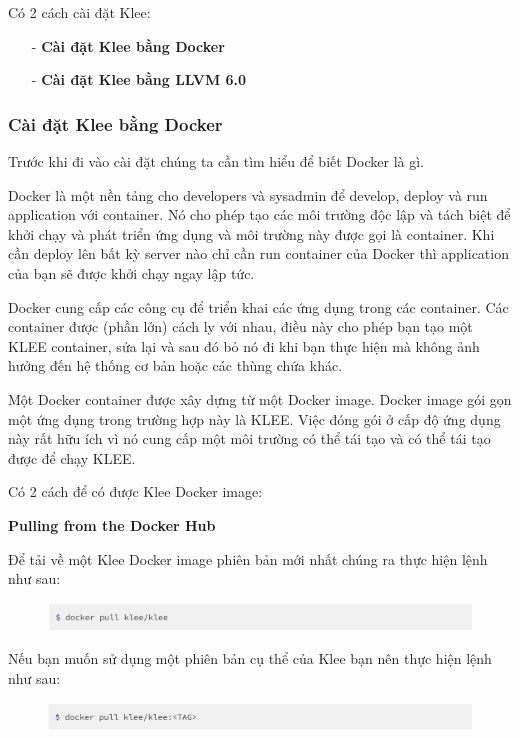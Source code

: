 \documentclass[12pt,a4paper]{article}
\begin{document}
Có 2 cách cài đặt Klee:
\begin{itemize}
\item[-] \textbf{Cài đặt Klee bằng Docker}
\item[-] \textbf{Cài đặt Klee bằng LLVM 6.0}
\end{itemize}

\subsubsection{Cài đặt Klee bằng Docker}
Trước khi đi vào cài đặt chúng ta cần tìm hiểu để biết Docker là gì.

Docker là một nền tảng cho developers và sysadmin để develop, deploy và run application với container. Nó cho phép tạo các môi trường độc lập và tách biệt để khởi chạy và phát triển ứng dụng và môi trường này được gọi là container. Khi cần deploy lên bất kỳ server nào chỉ cần run container của Docker thì application của bạn sẽ được khởi chạy ngay lập tức.

Docker cung cấp các công cụ để triển khai các ứng dụng trong các container. Các container được (phần lớn) cách ly với nhau, điều này cho phép bạn tạo một KLEE container, sửa lại và sau đó bỏ nó đi khi bạn thực hiện mà không ảnh hưởng đến hệ thống cơ bản hoặc các thùng chứa khác.

Một Docker container được xây dựng từ một Docker image. Docker image gói gọn một ứng dụng trong trường hợp này là KLEE. Việc đóng gói ở cấp độ ứng dụng này rất hữu ích vì nó cung cấp một môi trường có thể tái tạo và có thể tái tạo được để chạy KLEE.

Có 2 cách để có được Klee Docker image:

\textbf{Pulling from the Docker Hub}

Để tải về một Klee Docker image phiên bản mới nhất chúng ra thực hiện lệnh như sau:

\begin{figure}[ht]
\begin{center}
\includegraphics[scale=.3]{hinhanh/pulldocker.png}
\end{center}
\end{figure}

Nếu bạn muốn sử dụng một phiên bản cụ thể của Klee bạn nên thực hiện lệnh như sau:

\begin{figure}[ht]
\begin{center}
\includegraphics[scale=.3]{hinhanh/pulldockertag.png}
\end{center}
\end{figure}
\end{document}
